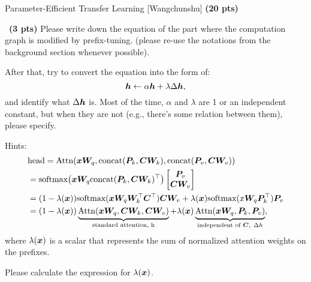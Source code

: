 \begin{question}{
Parameter-Efficient Transfer Learning [Wangchunshu] \textbf{(20 pts)}}
\begin{subquestion}{~\small \textbf{(3 pts)}}
Please write down the equation of the part where the computation graph is modified by prefix-tuning. (please re-use the notations from the background section whenever possible).

After that, try to convert the equation into the form of:
\begin{equation}
\label{eq:prefix}
    {\bm{h}} \leftarrow \alpha {\bm{h}} + \lambda \Delta{\bm{h}},
\end{equation}
and identify what $\Delta{\bm{h}}$ is. Most of the time, $\alpha$ and $\lambda$ are 1 or an independent constant, but when they are not (e.g., there's some relation between them), please specify.

Hints:
\begin{equation}
\label{eq:prefix-adapter}
\begin{split}
& \text{head} = \text{Attn}({\bm{x}}{\bm{W}}_q, \text{concat}({\bm{P}}_k, {\bm{C}}{\bm{W}}_k), \text{concat}({\bm{P}}_v, {\bm{C}}{\bm{W}}_v)) \\
& = \text{softmax}\big({\bm{x}}{\bm{W}}_q\text{concat}({\bm{P}}_k, {\bm{C}}{\bm{W}}_k)^\top\big) \begin{bmatrix} {\bm{P}}_v \\ {\bm{C}}{\bm{W}}_v \end{bmatrix} \\
& = (1 - \lambda({\bm{x}})) \text{softmax}({\bm{x}}{\bm{W}}_q{\bm{W}}_k^\top{\bm{C}}^\top){\bm{C}}{\bm{W}}_v + \lambda({\bm{x}})\text{softmax}(x{\bm{W}}_q{\bm{P}}_k^\top){\bm{P}}_v \\
& = (1 - \lambda({\bm{x}})) \underbrace{ \text{Attn}({\bm{x}}{\bm{W}}_q, {\bm{C}}{\bm{W}}_k, {\bm{C}}{\bm{W}}_v) }_{\text{standard attention, h}} + \lambda({\bm{x}}) \underbrace{ \text{Attn}({\bm{x}}{\bm{W}}_q, {\bm{P}}_k, {\bm{P}}_v) }_{\text{independent of }{\bm{C}},\  \Delta h},
\end{split}
\end{equation}
where $\lambda({\bm{x}})$ is a scalar that represents the sum of normalized attention weights on the prefixes.

Please calculate the expression for $\lambda({\bm{x}})$.

\end{subquestion}
\end{question}
